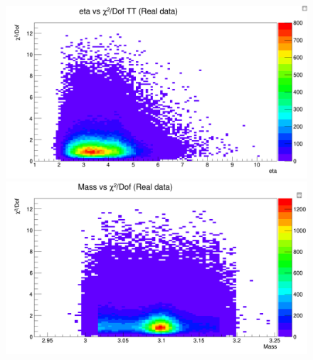 \begin{figure}[H]    
\begin{minipage}[t]{0.5\textwidth}
\includegraphics[width=\linewidth]{rozdzial6/JPsi_eta_chi2TT_data.png}
\end{minipage}
\hspace{\fill}
\begin{minipage}[t]{0.5\textwidth}
\includegraphics[width=\linewidth]{rozdzial6/JPsi_mass_chi2TT_data.png}
\end{minipage}


\end{figure}
